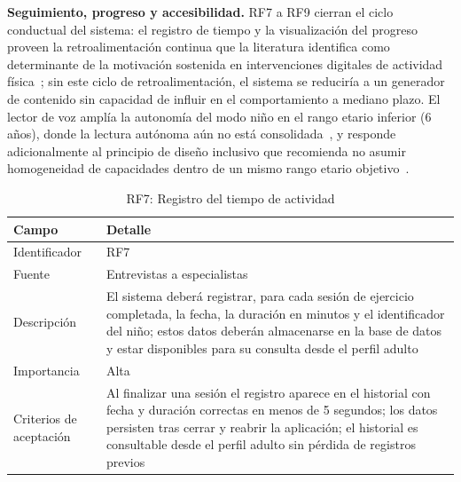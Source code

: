 					\textbf{Seguimiento, progreso y accesibilidad.} RF7 a RF9 cierran el ciclo conductual del sistema: el registro de tiempo y la visualización del progreso proveen la retroalimentación continua que la literatura identifica como determinante de la motivación sostenida en intervenciones digitales de actividad física~\cite{WangJun2024,Domin2022}; sin este ciclo de retroalimentación, el sistema se reduciría a un generador de contenido sin capacidad de influir en el comportamiento a mediano plazo. El lector de voz amplía la autonomía del modo niño en el rango etario inferior (6 años), donde la lectura autónoma aún no está consolidada~\cite{Hourcade2015}, y responde adicionalmente al principio de diseño inclusivo que recomienda no asumir homogeneidad de capacidades dentro de un mismo rango etario objetivo~\cite{Hourcade2015}.
					
					\begin{table}[H]
						\centering\small
						\caption{RF7: Registro del tiempo de actividad}
						\label{tab:rf7}
						\begin{tabular}{p{3.5cm}p{11cm}}
							\hline
							\textbf{Campo} & \textbf{Detalle} \\
							\hline
							Identificador & RF7 \\
							
							Fuente & Entrevistas a especialistas \\
							
							Descripción & El sistema deberá registrar, para cada sesión de ejercicio completada, la fecha, la duración en minutos y el identificador del niño; estos datos deberán almacenarse en la base de datos y estar disponibles para su consulta desde el perfil adulto \\
							
							Importancia & Alta \\
							
							Criterios de aceptación & Al finalizar una sesión el registro aparece en el historial con fecha y duración correctas en menos de 5 segundos; los datos persisten tras cerrar y reabrir la aplicación; el historial es consultable desde el perfil adulto sin pérdida de registros previos \\
							\hline
						\end{tabular}
					\end{table} \tblnote
					
